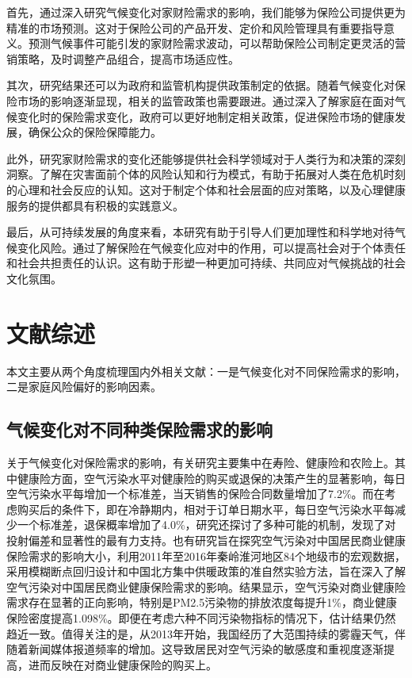 首先，通过深入研究气候变化对家财险需求的影响，我们能够为保险公司提供更为精准的市场预测。这对于保险公司的产品开发、定价和风险管理具有重要指导意义。预测气候事件可能引发的家财险需求波动，可以帮助保险公司制定更灵活的营销策略，及时调整产品组合，提高市场适应性。

其次，研究结果还可以为政府和监管机构提供政策制定的依据。随着气候变化对保险市场的影响逐渐显现，相关的监管政策也需要跟进。通过深入了解家庭在面对气候变化时的保险需求变化，政府可以更好地制定相关政策，促进保险市场的健康发展，确保公众的保险保障能力。

此外，研究家财险需求的变化还能够提供社会科学领域对于人类行为和决策的深刻洞察。了解在灾害面前个体的风险认知和行为模式，有助于拓展对人类在危机时刻的心理和社会反应的认知。这对于制定个体和社会层面的应对策略，以及心理健康服务的提供都具有积极的实践意义。

最后，从可持续发展的角度来看，本研究有助于引导人们更加理性和科学地对待气候变化风险。通过了解保险在气候变化应对中的作用，可以提高社会对于个体责任和社会共担责任的认识。这有助于形塑一种更加可持续、共同应对气候挑战的社会文化氛围。

\section{文献综述}

本文主要从两个角度梳理国内外相关文献：一是气候变化对不同保险需求的影响，二是家庭风险偏好的影响因素。

\subsection{气候变化对不同种类保险需求的影响}
关于气候变化对保险需求的影响，有关研究主要集中在寿险、健康险和农险上。其中健康险方面，空气污染水平对健康险的购买或退保的决策产生的显著影响\citep{2018Something}，每日空气污染水平每增加一个标准差，当天销售的保险合同数量增加了7.2\%。而在考虑购买后的条件下，即在冷静期内，相对于订单日期水平，每日空气污染水平每减少一个标准差，退保概率增加了4.0\%，研究还探讨了多种可能的机制，发现了对投射偏差和显著性的最有力支持。也有研究旨在探究空气污染对中国居民商业健康保险需求的影响大小\citep{赵强2021空气污染对商业健康保险需求的影响}，利用2011年至2016年秦岭淮河地区84个地级市的宏观数据，采用模糊断点回归设计和中国北方集中供暖政策的准自然实验方法，旨在深入了解空气污染对中国居民商业健康保险需求的影响。结果显示，空气污染对商业健康险需求存在显著的正向影响，特别是PM2.5污染物的排放浓度每提升1\%，商业健康保险密度提高1.098\%。即便在考虑六种不同污染物指标的情况下，估计结果仍然趋近一致。值得关注的是，从2013年开始，我国经历了大范围持续的雾霾天气，伴随着新闻媒体报道频率的增加。这导致居民对空气污染的敏感度和重视度逐渐提高，进而反映在对商业健康保险的购买上。

